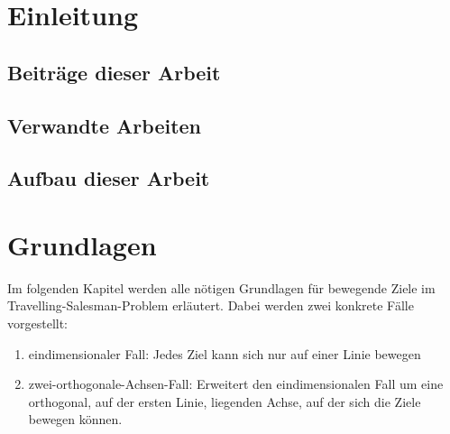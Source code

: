 \documentclass[german,version-2019-11]{uzl-thesis}
\begin{document}
\chapter{Einleitung}


\section{Beiträge dieser Arbeit}



\section{Verwandte Arbeiten}



\section{Aufbau dieser Arbeit}


\chapter{Grundlagen}
\label{chapter-use}
Im folgenden Kapitel werden alle nötigen Grundlagen für bewegende Ziele im Travelling-Salesman-Problem erläutert. Dabei werden zwei konkrete Fälle vorgestellt:
\begin{enumerate}
\item eindimensionaler Fall: Jedes Ziel kann sich nur auf einer Linie bewegen
\item zwei-orthogonale-Achsen-Fall: Erweitert den eindimensionalen Fall um eine orthogonal, auf der ersten Linie, liegenden Achse, auf der sich die Ziele bewegen können.
\end{enumerate}
\end{document}
